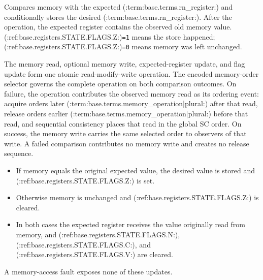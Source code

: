 Compares memory with the expected (:term:base.terms.rn_register:) and conditionally stores the desired (:term:base.terms.rn_register:). After the operation, the expected register contains the observed old memory value. (:ref:base.registers.STATE.FLAGS.Z:)\texttt{=1} means the store happened; (:ref:base.registers.STATE.FLAGS.Z:)\texttt{=0} means memory was left unchanged.


The memory read, optional memory write, expected-register update, and flag update form one atomic read-modify-write operation.
The encoded memory-order selector governs the complete operation on both comparison outcomes. On failure, the
operation contributes the observed memory read as its ordering event: acquire orders later (:term:base.terms.memory_operation|plural:) after
that read, release orders earlier (:term:base.terms.memory_operation|plural:) before that read, and sequential consistency places that read in
the global SC order. On success, the memory write carries the same selected order to observers of that write. A
failed comparison contributes no memory write and creates no release sequence.

\begin{itemize}
\item If memory equals the original expected value, the desired value is stored and (:ref:base.registers.STATE.FLAGS.Z:) is set.
\item Otherwise memory is unchanged and (:ref:base.registers.STATE.FLAGS.Z:) is cleared.
\item In both cases the expected register receives the value originally read from memory, and (:ref:base.registers.STATE.FLAGS.N:), (:ref:base.registers.STATE.FLAGS.C:), and (:ref:base.registers.STATE.FLAGS.V:) are cleared.
\end{itemize}
A memory-access fault exposes none of these updates.
